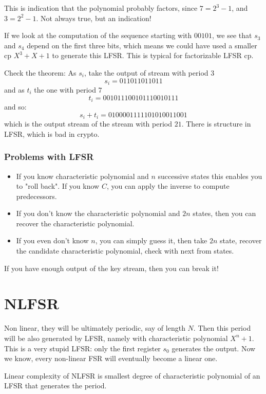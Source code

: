 \documentclass[language=english,number=]{homework}
\begin{document}
This is indication that the polynomial probably factors, since $7 = 2^3 - 1$, and $3 = 2^2 - 1$.
Not always true, but an indication!

If we look at the computation of the sequence starting with $00101$, we see that $s_3$ and $s_4$ depend on the first three bits, which means we could have used a smaller cp $X^3 + X + 1$ to generate this LFSR.
This is typical for factorizable LFSR cp.

Check the theorem:
As $s_i$, take the output of stream with period $3$
\[
s_i = 011 011 011 011
\]
and as $t_i$ the one with period $7$
\[
t_i = 001011100101110010111
\]
and so:
\[
s_i + t_i = 0100001111101010011001
\]
which is the output stream of the stream with period $21$.
There is structure in LFSR, which is bad in crypto.


\subsubsection{Problems with LFSR}

\begin{itemize}
\item If you know characteristic polynomial and $n$ successive states this enables you to "roll back".
If you know $C$, you can apply the inverse to compute predecessors.
\item If you don't know the characteristic polynomial and $2n$ states, then you can recover the characteristic polynomial. %
\item If you even don't know $n$, you can simply guess it, then take $2n$ state, recover the candidate characteristic polynomial, check with next from states.
\end{itemize}
If you have enough output of the key stream, then you can break it!

\newpage
\section{NLFSR}

Non linear, they will be ultimately periodic, say of length $N$.
Then this period will be also generated by LFSR, namely with characteristic polynomial $X^n + 1$.
This is a very stupid LFSR: only the first register $s_0$ generates the output.
Now we know, every non-linear FSR will eventually become a linear one.

\begin{definition}
Linear complexity of NLFSR is smallest degree of characteristic polynomial of an LFSR that generates the period.
\end{definition}
\end{document}
